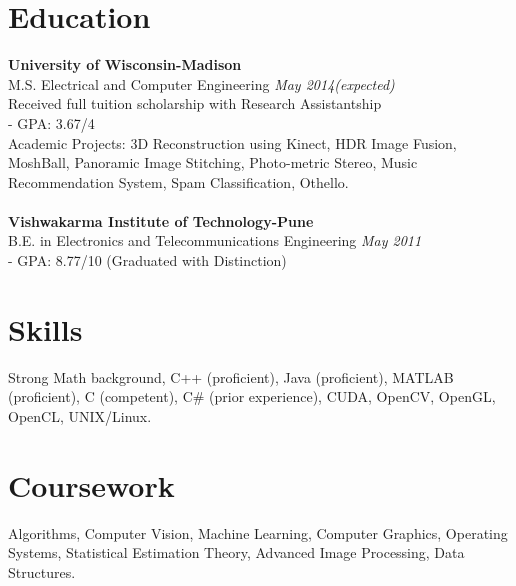 \documentclass[margin]{res}
\begin{document}
 

 

\address{thite@wisc.edu\\(408) 601-9349}
\address{2110 University Avenue, Apt. 104, \\ Madison, WI-53726.}

 
\begin{resume} 
 

\section{Education} 
{\bf University of Wisconsin-Madison} \\
M.S. Electrical and Computer Engineering \hfill {\it May 2014(expected)} \\
Received full tuition scholarship with Research Assistantship \\
- GPA: 3.67/4 \\
Academic Projects: 3D Reconstruction using Kinect, HDR Image Fusion, MoshBall, Panoramic Image Stitching, Photo-metric Stereo, Music Recommendation System, Spam Classification, Othello.
\\ \\
{\bf Vishwakarma Institute of Technology-Pune} \\
B.E. in Electronics and Telecommunications Engineering \hfill {\it May 2011} \\
- GPA: 8.77/10 (Graduated with Distinction)
\section{Skills}
Strong Math background, C++ (proficient), Java (proficient), MATLAB (proficient), C (competent), C\# (prior experience), CUDA, OpenCV, OpenGL, OpenCL, UNIX/Linux.

\section{Coursework}
Algorithms, Computer Vision, Machine Learning, Computer Graphics, Operating Systems, Statistical Estimation Theory, Advanced Image Processing, Data Structures.


\end{resume}
\end{document}
